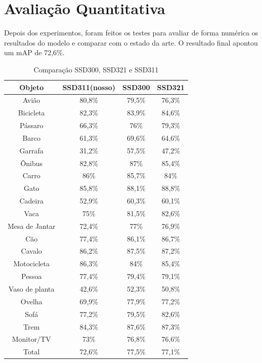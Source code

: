 \section{Avaliação Quantitativa}
\label{secao:5:1:3}

Depois dos experimentos, foram feitos os testes para avaliar de forma numérica os resultados do modelo e comparar com o estado da arte. O resultado final apontou um \ac{mAP} de 72,6\%. 

  \begin{table}[H]
    \centering
    \footnotesize
    \setlength{\abovecaptionskip}{0pt}
    \setlength{\belowcaptionskip}{0pt}
    \caption[Resultados SSD]{Comparação SSD300, SSD321 e SSD311}
    \label{tab:resultados}
    \begin{tabular}{c|c|c|c}
	Objeto &	SSD311(nosso) & SSD300 & SSD321 \\ 
	\hline 
 	Avião 			& 80,8\%	& 79,5\% 	& 76,3\% \\ 
	Bicicleta 		& 82,3\%	& 83,9\% 	& 84,6\%  \\ 
	Pássaro 		& 66,3\%	& 76\%  	& 79,3\%  \\
	Barco 			& 61,3\%	& 69,6\% 	& 64,6\%  \\ 
	Garrafa 		& 31,2\%	& 57,5\%  	& 47,2\%  \\ 
	Ônibus 			& 82,8\%	& 87\%	 	& 85,4\%  \\
	Carro 			& 86\%		& 85,7\%  	& 84\%  \\ 
	Gato 			& 85,8\%	& 88,1\%  	& 88,8\%  \\
	Cadeira 		& 52,9\%	& 60,3\%  	& 60,1\%  \\ 
	Vaca 			& 75\% 		& 81,5\% 	& 82,6\%  \\
	Mesa de Jantar 	& 72,4\% 	& 77\%  	& 76,9\%  \\ 
	Cão 			& 77,4\% 	& 86,1\% 	& 86,7\%  \\
	Cavalo 			& 86,2\% 	& 87,5\% 	& 87,2\%  \\ 
	Motocicleta 	& 86,3\% 	& 84\%  	& 85,4\%  \\
	Pessoa 			& 77,4\% 	& 79,4\%  	& 79,1\%  \\ 
	Vaso de planta 	& 42,6\% 	& 52,3\%  	& 50,8\%  \\
	Ovelha 			& 69,9\%	& 77,9\%  	& 77,2\%  \\
	Sofá 			& 77,2\% 	& 79,5\%  	& 82,6\%  \\
	Trem 			& 84,3\% 	& 87,6\%  	& 87,3\%  \\
	Monitor/TV 		& 73\% 		& 76,8\%  	& 76,6\%  \\ 
	Total 			& 72,6\% 	& 77,5\%  	& 77,1\%  \\
    \end{tabular}
    \\
  \end{table}


